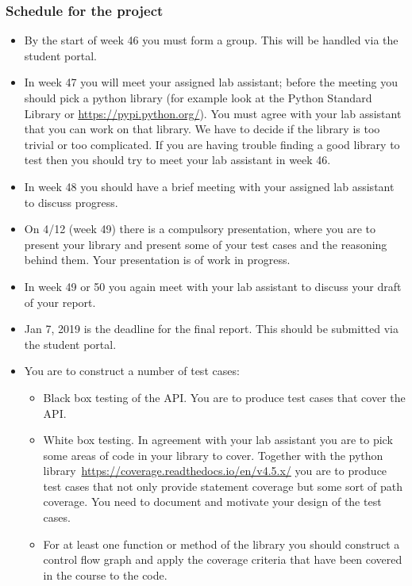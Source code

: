 \documentclass[a4page]{article}
\begin{document}
\subsubsection*{Schedule for the project}
  \begin{itemize}
  \item By  the start of  week  46 you must form a group. This will be
    handled via the student portal.
  \item In week 47 you will meet your assigned lab assistant; before the
    meeting you should pick a python library (for example look at the Python
    Standard Library or \url{https://pypi.python.org/}). You must agree
    with your lab assistant that you can work on that library. We have
    to decide if the library is too trivial or too complicated. If you are
    having trouble finding a good library to test then you should try to meet
    your lab assistant in week 46.
  \item In week 48 you should have a brief meeting with your assigned lab
    assistant to discuss progress.
  \item On 4/12 (week 49) there is a compulsory presentation, where you are
      to present your library and present some of your test cases
      and the reasoning behind them. Your presentation is of work in
      progress.
    \item In week 49 or 50 you again meet with your lab assistant to
      discuss your draft of your  report.
    \item Jan 7,  2019 is  the deadline for the final
      report. This should be submitted via the student portal.

\end{itemize}


\begin{itemize}

    \item You are to construct a number of test cases:
    \begin{itemize}
    \item  Black box testing of the API. You are to produce test cases
      that cover the API.
    \item  White box testing. In agreement with your lab assistant you
      are to pick some areas of code in your library to cover. Together with
      the python library~\url{https://coverage.readthedocs.io/en/v4.5.x/} you are
      to produce test cases that not only provide statement coverage
      but some sort of path coverage. You need to document and
      motivate your design of the test cases. 
    \item For at least one function or method of the library you
      should construct a control flow graph and apply the coverage criteria
      that have been covered in the course to the code.

    \end{itemize}
  \end{itemize}
\end{document}
